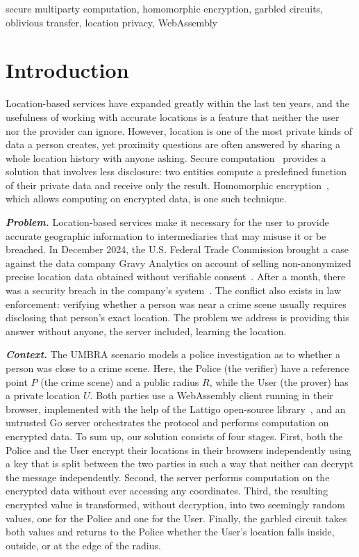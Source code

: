 \documentclass[conference,letterpaper]{IEEEtran}
\begin{document}
\begin{IEEEkeywords}
secure multiparty computation, homomorphic encryption, garbled circuits, oblivious transfer, location privacy, WebAssembly
\end{IEEEkeywords}

\section{Introduction}
Location-based services have expanded greatly within the last ten years, and the usefulness of working with accurate locations is a feature that neither the user nor the provider can ignore. However, location is one of the most private kinds of data a person creates, yet proximity questions are often answered by sharing a whole location history with anyone asking. Secure computation~\cite{yao86} provides a solution that involves less disclosure: two entities compute a predefined function of their private data and receive only the result. Homomorphic encryption~\cite{bgv}, which allows computing on encrypted data, is one such technique.

\textbf{\textit{Problem.}} Location-based services make it necessary for the user to provide accurate geographic information to intermediaries that may misuse it or be breached. In December 2024, the U.S. Federal Trade Commission brought a case against the data company Gravy Analytics on account of selling non-anonymized precise location data obtained without verifiable consent~\cite{ftc}. After a month, there was a security breach in the company's system~\cite{tc}. The conflict also exists in law enforcement: verifying whether a person was near a crime scene usually requires disclosing that person's exact location. The problem we address is providing this answer without anyone, the server included, learning the location.

\textbf{\textit{Context.}} The UMBRA scenario models a police investigation as to whether a person was close to a crime scene. Here, the Police (the verifier) have a reference point $P$ (the crime scene) and a public radius $R$, while the User (the prover) has a private location $U$. Both parties use a WebAssembly client running in their browser, implemented with the help of the Lattigo open-source library~\cite{lattigo}, and an untrusted Go server orchestrates the protocol and performs computation on encrypted data. To sum up, our solution consists of four stages. First, both the Police and the User encrypt their locations in their browsers independently using a key that is split between the two parties in such a way that neither can decrypt the message independently. Second, the server performs computation on the encrypted data without ever accessing any coordinates. Third, the resulting encrypted value is transformed, without decryption, into two seemingly random values, one for the Police and one for the User. Finally, the garbled circuit takes both values and returns to the Police whether the User's location falls inside, outside, or at the edge of the radius.
\end{document}
